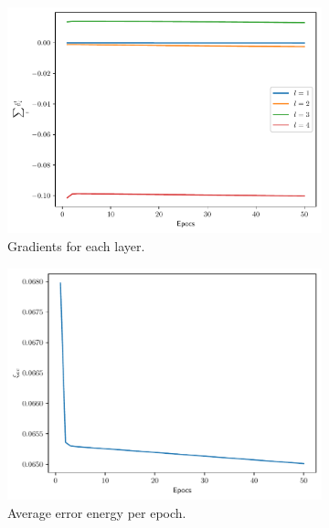 \documentclass[conference]{IEEEtran}
\theoremstyle{definition}
\theoremstyle{remark}
\theoremstyle{remark}
\begin{document}
\begin{figure}
    \centering
    \begin{subfigure}[b]{0.32\textwidth}
        \centering
        \includegraphics[width=\textwidth]{figs/1-2-3-0.9-gradients.pdf}
        \caption{Gradients for each layer.}
        \label{subfig:grad-worst-NN}
    \end{subfigure}
    \begin{subfigure}[b]{0.32\textwidth}
        \centering
        \includegraphics[width=\textwidth]{figs/1-2-3-0.9-error.pdf}
        \caption{Average error energy per epoch.}
        \label{subfig:error-worst-NN}
    \end{subfigure}
    \begin{subfigure}[b]{0.32\textwidth}
        \centering

\end{subfigure}
\end{figure}
\end{document}
